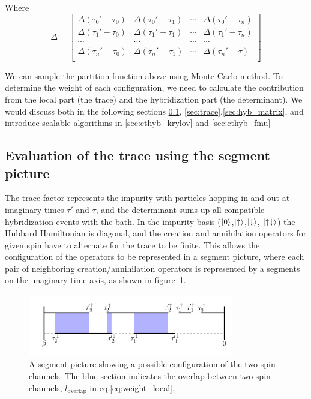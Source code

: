 Where 
\begin{equation}
  \label{eq:hyb-matrix}
  \Delta=\left[
    \begin{array}{cccc}
      \Delta(\tau_0'-\tau_0) & \Delta(\tau_0'-\tau_1) & \cdots & \Delta(\tau_0'-\tau_n)\\
      \Delta(\tau_1'-\tau_0) & \Delta(\tau_1'-\tau_1) & \cdots & \Delta(\tau_1'-\tau_n)\\
      \cdots & \cdots & \cdots & \cdots \\
      \Delta(\tau_n'-\tau_0) & \Delta(\tau_n'-\tau_1) & \cdots & \Delta(\tau_n'-\tau)\\
    \end{array}
  \right]
\end{equation}


We can sample the partition function above using Monte Carlo method. To 
determine the weight of each configuration, we need to calculate the contribution
from the local part (the trace) and the hybridization part (the determinant).
We would discuss both in the following sections \ref{sec:trace_segment},
\ref{sec:trace},\ref{sec:hyb_matrix}, and introduce scalable 
algorithms in \ref{sec:cthyb_krylov} and \ref{sec:cthyb_fmu}

\subsection{Evaluation of the trace using the segment picture}
\label{sec:trace_segment}
The trace factor represents the impurity with particles hopping in and out at 
imaginary times $\tau'$ and $\tau$, and the determinant sums up all compatible 
hybridization events with the bath. 
In the impurity basis ($\left|0\right\rangle$,$\left|\uparrow\right\rangle$,$\left|\downarrow\right\rangle$,
$\left|\uparrow\downarrow\right\rangle$) the Hubbard Hamiltonian is diagonal, 
and the creation and annihilation operators for given spin have to alternate 
for the trace to be finite. This allows the configuration of the operators to be
represented in a segment picture, where each pair of neighboring creation/annihilation 
operators is represented by a segments on the imaginary time axis, as shown in 
figure~\ref{fig:seg}.

\begin{figure}[ht]
  \centering
  \includegraphics[width=0.8\textwidth] {img/segment.png}
  \caption{A segment picture showing a possible configuration of the two spin 
    channels. 
    The blue section indicates the overlap between two spin channels, 
    $l_\textrm{overlap}$ in eq.\ref{eq:weight_local}.}
\label{fig:seg}
\end{figure}


